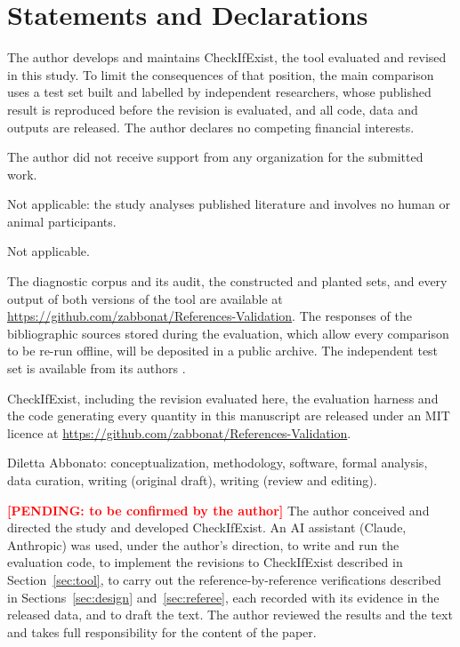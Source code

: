 \documentclass[pdflatex,sn-apa]{sn-jnl}
\newcommand{\pending}[1]{\textcolor{red}{\textbf{[PENDING: #1]}}}
\begin{document}
\backmatter

\section*{Statements and Declarations}

The author develops and maintains CheckIfExist, the tool evaluated and revised in this study. To limit the consequences of that position, the main comparison uses a test set built and labelled by independent researchers, whose published result is reproduced before the revision is evaluated, and all code, data and outputs are released. The author declares no competing financial interests.

The author did not receive support from any organization for the submitted work.

Not applicable: the study analyses published literature and involves no human or animal participants.

Not applicable.

The diagnostic corpus and its audit, the constructed and planted sets, and every output of both versions of the tool are available at \url{https://github.com/zabbonat/References-Validation}. The responses of the bibliographic sources stored during the evaluation, which allow every comparison to be re-run offline, will be deposited in a public archive. The independent test set is available from its authors \citep{badalova2026data}.

CheckIfExist, including the revision evaluated here, the evaluation harness and the code generating every quantity in this manuscript are released under an MIT licence at \url{https://github.com/zabbonat/References-Validation}.

Diletta Abbonato: conceptualization, methodology, software, formal analysis, data curation, writing (original draft), writing (review and editing).

\pending{to be confirmed by the author}
The author conceived and directed the study and developed CheckIfExist. An AI assistant (Claude, Anthropic) was used, under the author's direction, to write and run the evaluation code, to implement the revisions to CheckIfExist described in Section~\ref{sec:tool}, to carry out the reference-by-reference verifications described in Sections~\ref{sec:design} and~\ref{sec:referee}, each recorded with its evidence in the released data, and to draft the text. The author reviewed the results and the text and takes full responsibility for the content of the paper.


\end{document}

